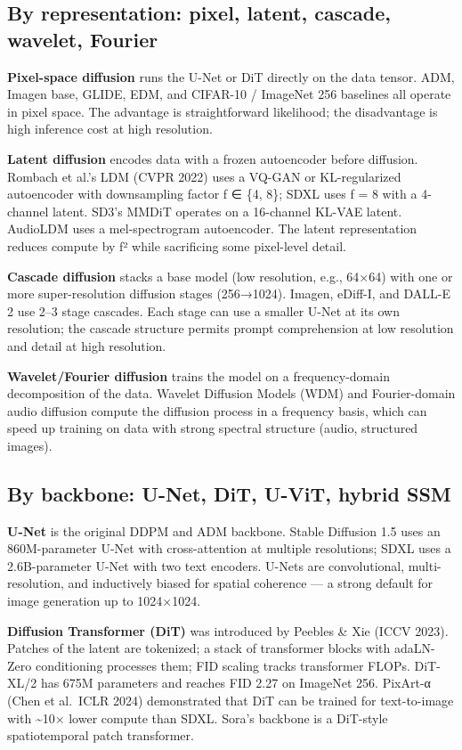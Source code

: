 \subsection{By representation: pixel, latent, cascade, wavelet, Fourier}\label{by-representation-pixel-latent-cascade-wavelet-fourier}

\textbf{Pixel-space diffusion} runs the U-Net or DiT directly on the data tensor. ADM, Imagen base, GLIDE, EDM, and CIFAR-10 / ImageNet 256 baselines all operate in pixel space. The advantage is straightforward likelihood; the disadvantage is high inference cost at high resolution.

\textbf{Latent diffusion} encodes data with a frozen autoencoder before diffusion. Rombach et al.'s LDM (CVPR 2022) uses a VQ-GAN or KL-regularized autoencoder with downsampling factor f ∈ \{4, 8\}; SDXL uses f = 8 with a 4-channel latent. SD3's MMDiT operates on a 16-channel KL-VAE latent. AudioLDM uses a mel-spectrogram autoencoder. The latent representation reduces compute by f² while sacrificing some pixel-level detail.

\textbf{Cascade diffusion} stacks a base model (low resolution, e.g., 64×64) with one or more super-resolution diffusion stages (256→1024). Imagen, eDiff-I, and DALL-E 2 use 2--3 stage cascades. Each stage can use a smaller U-Net at its own resolution; the cascade structure permits prompt comprehension at low resolution and detail at high resolution.

\textbf{Wavelet/Fourier diffusion} trains the model on a frequency-domain decomposition of the data. Wavelet Diffusion Models (WDM) and Fourier-domain audio diffusion compute the diffusion process in a frequency basis, which can speed up training on data with strong spectral structure (audio, structured images).

\subsection{By backbone: U-Net, DiT, U-ViT, hybrid SSM}\label{by-backbone-u-net-dit-u-vit-hybrid-ssm}

\textbf{U-Net} is the original DDPM and ADM backbone. Stable Diffusion 1.5 uses an 860M-parameter U-Net with cross-attention at multiple resolutions; SDXL uses a 2.6B-parameter U-Net with two text encoders. U-Nets are convolutional, multi-resolution, and inductively biased for spatial coherence --- a strong default for image generation up to 1024×1024.

\textbf{Diffusion Transformer (DiT)} was introduced by Peebles \& Xie (ICCV 2023). Patches of the latent are tokenized; a stack of transformer blocks with adaLN-Zero conditioning processes them; FID scaling tracks transformer FLOPs. DiT-XL/2 has 675M parameters and reaches FID 2.27 on ImageNet 256. PixArt-α (Chen et al.~ICLR 2024) demonstrated that DiT can be trained for text-to-image with \textasciitilde10× lower compute than SDXL. Sora's backbone is a DiT-style spatiotemporal patch transformer.

